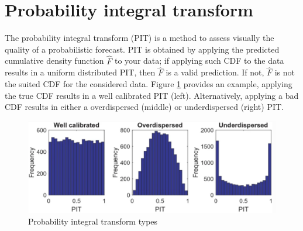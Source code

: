 \section{Probability integral transform}
The probability integral transform (PIT) is a method to assess visually the quality of a probabilistic forecast. PIT is obtained by applying the predicted cumulative density function $\hat{F}$ to your data; if applying such CDF to the data results in a uniform distributed PIT, then $\hat{F}$ is a valid prediction. If not, $\hat{F}$ is not the suited CDF for the considered data. Figure \ref{fig:pit} provides an example, applying the true CDF results in a well calibrated PIT (left). Alternatively, applying a bad CDF results in either a overdispersed (middle) or underdispersed (right) PIT.
\begin{figure}
    \includegraphics[width=\textwidth]{images/pit.png}
    \caption{Probability integral transform types \cite{haben2023core}}
    \label{fig:pit}
  \end{figure}
\\

